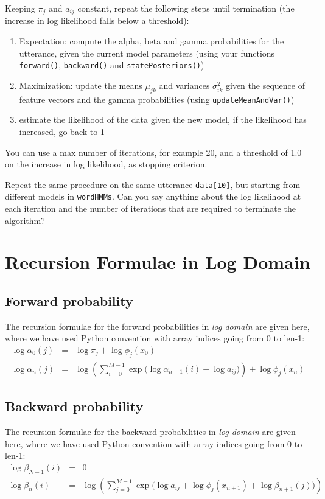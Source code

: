 \documentclass{nada-ten}
\begin{document}
Keeping $\pi_j$ and $a_{ij}$ constant, repeat the following steps until termination (the increase in log likelihood falls below a threshold):
\begin{enumerate}
\item Expectation: compute the alpha, beta and gamma probabilities for the utterance, given the current model parameters (using your functions \texttt{forward()}, \texttt{backward()} and \texttt{statePosteriors()})
\item Maximization: update the means $\mu_{jk}$ and variances $\sigma^2_{ik}$ given the sequence of feature vectors and the gamma probabilities (using \texttt{updateMeanAndVar()})
\item estimate the likelihood of the data given the new model, if the likelihood has increased, go back to 1
\end{enumerate}
You can use a max number of iterations, for example 20, and a threshold of 1.0 on the increase in log likelihood, as stopping criterion.

Repeat the same procedure on the same utterance \texttt{data[10]}, but starting from different models in \verb|wordHMMs|. Can you say anything about the log likelihood at each iteration and the number of iterations that are required to terminate the algorithm?
\clearpage
\appendix

\section{Recursion Formulae in Log Domain}
\label{sec:recursions}

\subsection{Forward probability}
The recursion formulae for the forward probabilities in \emph{log domain} are given here, where we have used Python convention with array indices going from 0 to len-1:
\begin{eqnarray*}
  \log\alpha_0(j) &=& \log\pi_j + \log\phi_j(x_0) \\
  \log\alpha_n(j) &=& \log\left(\sum_{i=0}^{M-1} \exp\Big(\log\alpha_{n-1}(i) + \log a_{ij}\Big)\right) + \log\phi_j(x_n)
\end{eqnarray*}

\subsection{Backward probability}
The recursion formulae for the backward probabilities in \emph{log domain} are given here, where we have used Python convention with array indices going from 0 to len-1:
\begin{eqnarray*}
  \log\beta_{N-1}(i) &=& 0 \\
  \log\beta_n(i) &=& \log\left(\sum_{j=0}^{M-1} \exp\Big(\log a_{ij} + \log\phi_j(x_{n+1}) + \log\beta_{n+1}(j)\Big)\right)
\end{eqnarray*}
\end{document}
